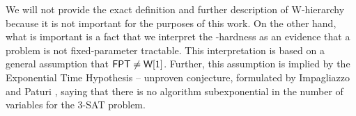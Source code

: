 We will not provide the exact definition and further description of W-hierarchy
because it is not important for the purposes of this work.
On the other hand, what is important is a fact that we interpret the \W-hardness as an evidence that
a problem is not fixed-parameter tractable.
This interpretation is based on a general assumption that $\textsf{FPT} \neq \textsf{W}[1]$.
Further, this assumption is implied by the Exponential Time Hypothesis -- unproven conjecture,
formulated by Impagliazzo and Paturi \cite{Impagliazzo1999}, saying that there is no
algorithm subexponential in the number of variables for the $3$-\textsc{SAT} problem.
